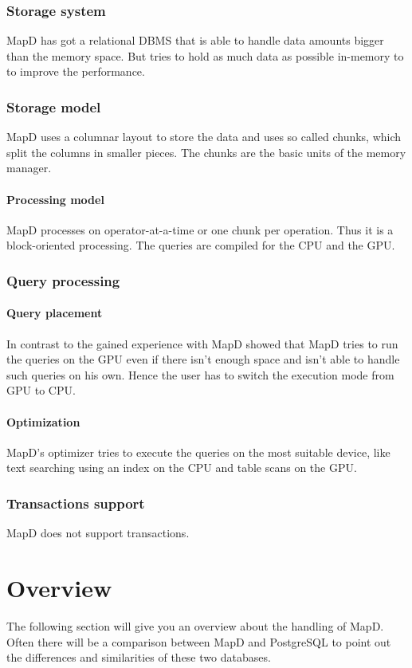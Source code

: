 \subsubsection{Storage system} MapD has got a relational DBMS that is able to handle data amounts bigger than the memory space.
But tries to hold as much data as possible in-memory to to improve the performance.
\subsubsection{Storage model} MapD uses a columnar layout to store the data and uses so called chunks, which split the columns in smaller pieces.
The chunks are the basic units of the memory manager.
\paragraph{Processing model} MapD processes on operator-at-a-time or one chunk per operation. Thus it is a block-oriented processing.
The queries are compiled for the CPU and the GPU.
\subsubsection{Query processing}
\paragraph{Query placement} In contrast to \cite{bress2014gpu} the gained experience with MapD showed that MapD tries to run the queries on the GPU even if there isn't enough space and isn't able to handle such queries on his own.
Hence the user has to switch the execution mode from GPU to CPU.
\paragraph{Optimization} MapD's optimizer tries to execute the queries on the most suitable device, like text searching using an index on the CPU and table scans on the GPU.
\subsubsection{Transactions support} MapD does not support transactions.


\newpage
\section{Overview}

The following section will give you an overview about the handling of MapD.
Often there will be a comparison between MapD and PostgreSQL to point out the differences and similarities of these two databases.



